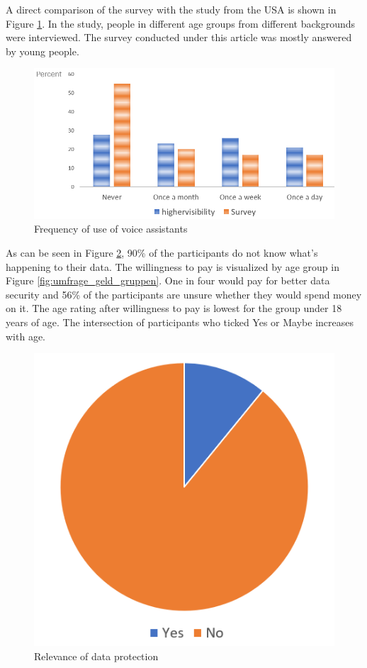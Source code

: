 A direct comparison of the survey with the study from the USA is shown in Figure \ref{fig: survey_base}. In the study, people in different age groups from different backgrounds were interviewed. The survey conducted under this article was mostly answered by young people.
\begin{figure}[h]
	\centering
	\includegraphics[width=0.9\linewidth]{Picture/umfrage_haeufigkeit}
	\caption[Frequency of use of voice assistants]{Frequency of use of voice assistants}
	\label{fig: survey_base}
\end{figure} 

As can be seen in Figure \ref{fig:umfrage_datenschutz}, 90\% of the participants do not know what's happening to their data. The willingness to pay is visualized by age group in Figure \ref{fig:umfrage_geld_gruppen}. One in four would pay for better data security and 56\% of the participants are unsure whether they would spend money on it. The age rating after willingness to pay is lowest for the group under 18 years of age. The intersection of participants who ticked \glqq Yes\grqq{} or \glqq Maybe\grqq{} increases with age.

\begin{figure}[h]
	\centering
	\includegraphics[width=0.5\linewidth]{Picture/umfrage_datenschutz}
	\caption[Relevance of data protection]{Relevance of data protection}
	\label{fig:umfrage_datenschutz}
\end{figure}

